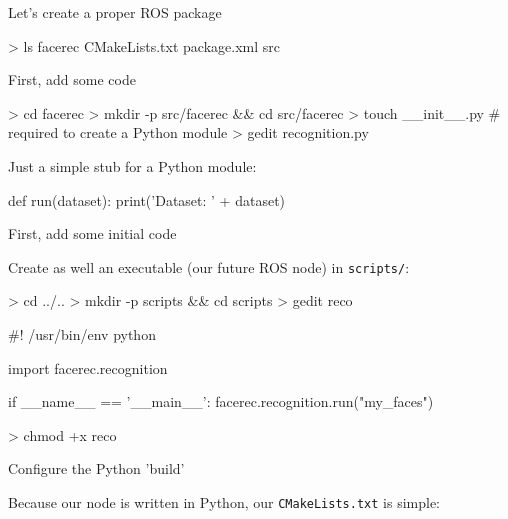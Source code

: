 \documentclass[compress]{beamer}
\begin{document}
\begin{frame}[fragile]{Let's create a proper ROS package}

\pause
\begin{shcode}
> ls facerec
CMakeLists.txt  package.xml  src
\end{shcode}

\end{frame}

\begin{frame}[fragile]{First, add some code}

\begin{shcode}
> cd facerec
> mkdir -p src/facerec && cd src/facerec
> touch __init__.py # required to create a Python module
> gedit recognition.py
\end{shcode}
\pause

Just a simple stub for a Python module:

\begin{pythoncode}
def run(dataset):
    print('Dataset: ' + dataset)
\end{pythoncode}

\end{frame}

\begin{frame}[fragile]{First, add some initial code}

Create as well an executable (our future ROS node) in \texttt{scripts/}:

\begin{shcode}
> cd ../..
> mkdir -p scripts && cd scripts
> gedit reco
\end{shcode}
\pause

\begin{pythoncode}
#! /usr/bin/env python

import facerec.recognition

if __name__ == '__main__':
    facerec.recognition.run("my_faces")
\end{pythoncode}

\pause

\begin{shcode}
> chmod +x reco
\end{shcode}
\end{frame}

\begin{frame}[fragile]{Configure the Python 'build'}

Because our node is written in Python, our \texttt{CMakeLists.txt} is simple:

\end{frame}
\end{document}
